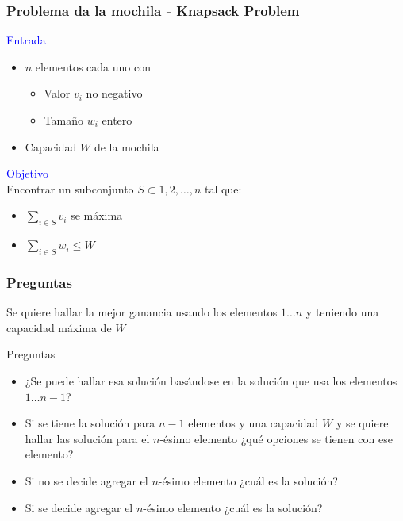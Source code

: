 \documentclass{beamer}
\begin{document}
	\begin{frame}
		\frametitle{Problema da la mochila - Knapsack Problem}
		\textcolor{blue}{\large Entrada}\\
		\begin{itemize}
			\item $n$ elementos cada uno con 
				\begin{itemize}
					\item Valor $v_i$ no negativo
					\item Tamaño $w_i$ entero
				\end{itemize}
			\item Capacidad $W$ de la mochila
		\end{itemize}
		\textcolor{blue}{\large Objetivo}\\
		Encontrar un subconjunto $S \subset {1, 2, \ldots , n}$ tal que:
		\begin{itemize}
			\item $\displaystyle\sum_{i \in S}{v_i}$ se máxima
			\item $\displaystyle\sum_{i \in S}{w_i} \leq W$
		\end{itemize}
	\end{frame}
	
	\begin{frame}
		\frametitle{Preguntas}		
		Se quiere hallar la mejor ganancia usando los elementos $1 \ldots n$ y teniendo una capacidad máxima de $W$
		\begin{alertblock}{Preguntas}
			\begin{itemize}
				\item ¿Se puede hallar esa solución basándose en la solución que usa los elementos $1 \ldots n-1$? \pause
				\item Si se tiene la solución para $n-1$ elementos y una capacidad $W$ y se quiere hallar las solución para el $n$-ésimo elemento ¿qué opciones se tienen con ese elemento? \pause
				\item Si no se decide agregar el $n$-ésimo elemento ¿cuál es la solución?
				\item Si se decide agregar el $n$-ésimo elemento ¿cuál es la solución?
			\end{itemize}
		\end{alertblock}
	\end{frame}
\end{document}
